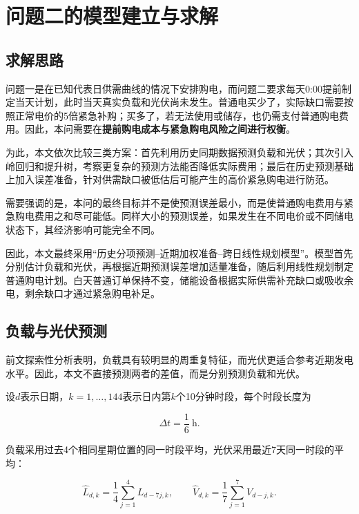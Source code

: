\section{问题二的模型建立与求解}

\subsection{求解思路}

问题一是在已知代表日供需曲线的情况下安排购电，而问题二要求每天0:00提前制定当天计划，此时当天真实负载和光伏尚未发生。普通电买少了，实际缺口需要按照正常电价的5倍紧急补购；买多了，若无法使用或储存，也仍需支付普通购电费用。因此，本问需要在\textbf{提前购电成本与紧急购电风险之间进行权衡}。

为此，本文依次比较三类方案：首先利用历史同期数据预测负载和光伏；其次引入岭回归和提升树，考察更复杂的预测方法能否降低实际费用；最后在历史预测基础上加入误差准备，针对供需缺口被低估后可能产生的高价紧急购电进行防范。

需要强调的是，本问的最终目标并不是使预测误差最小，而是使普通购电费用与紧急购电费用之和尽可能低。同样大小的预测误差，如果发生在不同电价或不同储电状态下，其经济影响可能完全不同。

因此，本文最终采用“历史分项预测--近期加权准备--跨日线性规划模型”。模型首先分别估计负载和光伏，再根据近期预测误差增加适量准备，随后利用线性规划制定普通购电计划。白天普通订单保持不变，储能设备根据实际供需补充缺口或吸收余电，剩余缺口才通过紧急购电补足。


\subsection{负载与光伏预测}

前文探索性分析表明，负载具有较明显的周重复特征，而光伏更适合参考近期发电水平。因此，本文不直接预测两者的差值，而是分别预测负载和光伏。

设$d$表示日期，$k=1,\ldots,144$表示日内第$k$个10分钟时段，每个时段长度为

\[
\Delta t=\frac{1}{6}\ \mathrm{h}.
\]

负载采用过去4个相同星期位置的同一时段平均，光伏采用最近7天同一时段的平均：

\begin{equation}
\widehat L_{d,k}
=
\frac{1}{4}\sum_{j=1}^{4}L_{d-7j,k},
\qquad
\widehat V_{d,k}
=
\frac{1}{7}\sum_{j=1}^{7}V_{d-j,k}.
\label{eq:q2_forecast}
\end{equation}

